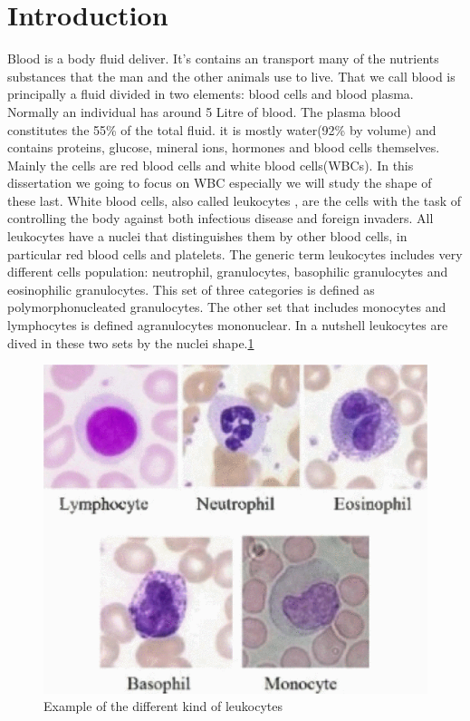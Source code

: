 
\chapter*{Introduction}
Blood is a body fluid deliver. It's contains an transport many of the nutrients substances that the man and the other animals use to live. That we call blood is principally a fluid divided in two elements: blood cells and blood plasma. Normally an individual has around 5 Litre of blood. The plasma blood constitutes the 55\% of the total fluid. it is mostly water(92\% by volume) and contains proteins, glucose, mineral ions, hormones and blood cells themselves.\cite{website:wiki} Mainly the cells are red blood cells and white blood cells(WBCs). In this dissertation we going to focus on WBC especially we will study the shape of these last.
White blood cells, also called leukocytes , are the cells with the task of controlling the body against both infectious disease and foreign invaders. All leukocytes have a nuclei that distinguishes them by other blood cells, in particular red blood cells and platelets. The generic term leukocytes includes very different cells population: neutrophil, granulocytes, basophilic granulocytes and eosinophilic granulocytes. This set of three categories is defined as   polymorphonucleated granulocytes. The other set that includes monocytes and lymphocytes is defined agranulocytes mononuclear. In a nutshell leukocytes are dived in these two sets by the nuclei shape.\ref{fig:kindLeuko}
\begin{figure}
	\begin{center}
		\centering
		\includegraphics[scale=0.5]{img/leuko.png}
		\caption{Example of the different kind of leukocytes\cite{ann17}}
		\label{fig:kindLeuko}
	\end{center}
\end{figure}
